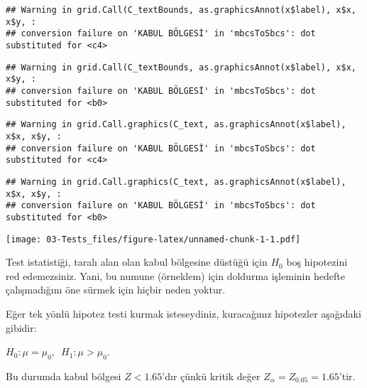 \documentclass[
  12pt,
]{book}
\begin{document}
\begin{verbatim}
## Warning in grid.Call(C_textBounds, as.graphicsAnnot(x$label), x$x, x$y, :
## conversion failure on 'KABUL BÖLGESİ' in 'mbcsToSbcs': dot substituted for <c4>
\end{verbatim}

\begin{verbatim}
## Warning in grid.Call(C_textBounds, as.graphicsAnnot(x$label), x$x, x$y, :
## conversion failure on 'KABUL BÖLGESİ' in 'mbcsToSbcs': dot substituted for <b0>
\end{verbatim}

\begin{verbatim}
## Warning in grid.Call.graphics(C_text, as.graphicsAnnot(x$label), x$x, x$y, :
## conversion failure on 'KABUL BÖLGESİ' in 'mbcsToSbcs': dot substituted for <c4>
\end{verbatim}

\begin{verbatim}
## Warning in grid.Call.graphics(C_text, as.graphicsAnnot(x$label), x$x, x$y, :
## conversion failure on 'KABUL BÖLGESİ' in 'mbcsToSbcs': dot substituted for <b0>
\end{verbatim}

\texttt{[image: 03-Tests\_files/figure-latex/unnamed-chunk-1-1.pdf]}

Test istatistiği, taralı alan olan kabul bölgesine düstüğü için \(H_{0}\) boş hipotezini red edemezsiniz. Yani, bu numune (örneklem) için doldurma işleminin hedefte çalışmadığını öne sürmek için hiçbir neden yoktur.

Eğer tek yönlü hipotez testi kurmak isteseydiniz, kuracağınız hipotezler aşağıdaki gibidir:

\(H_{0}: \mu = \mu_{0},\,\,\, H_{1}: \mu > \mu_{0}\).

Bu durumda kabul bölgesi \(Z < 1.65\)'dır çünkü kritik değer \(Z_{\alpha} = Z_{0.05} = 1.65\)'tir.
\end{document}
